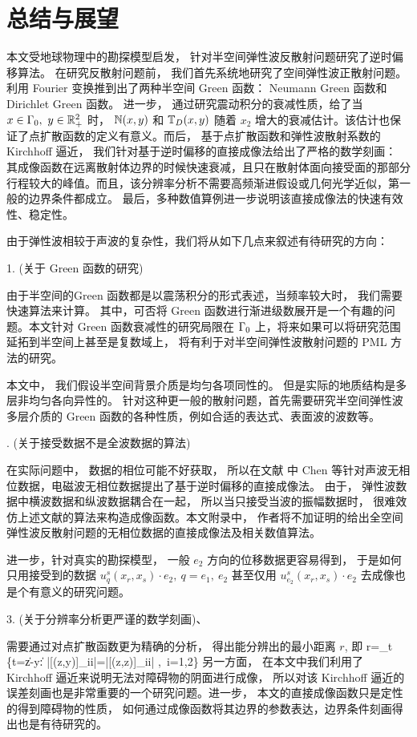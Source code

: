 \chapter{总结与展望} \label{chap:summary}

本文受地球物理中的勘探模型启发， 针对半空间弹性波反散射问题研究了逆时偏移算法。 在研究反散射问题前， 我们首先系统地研究了空间弹性波正散射问题。利用 Fourier 变换推到出了两种半空间 Green 函数： Neumann Green 函数和 Dirichlet Green 函数。 进一步， 通过研究震动积分的衰减性质，给了当 $x\in \Gamma_0, \ y\in \mathbb{R}^2_+$ 时， $\mathbb{N}(x,y)$ 和 $\mathbb{T}_D(x,y)$ 随着 $x_2$ 增大的衰减估计。该估计也保证了点扩散函数的定义有意义。而后， 基于点扩散函数和弹性波散射系数的 Kirchhoff 逼近， 我们针对基于逆时偏移的直接成像法给出了严格的数学刻画： 其成像函数在远离散射体边界的时候快速衰减，且只在散射体面向接受面的那部分行程较大的峰值。而且，该分辨率分析不需要高频渐进假设或几何光学近似，第一般的边界条件都成立。 最后，多种数值算例进一步说明该直接成像法的快速有效性、稳定性。

由于弹性波相较于声波的复杂性，我们将从如下几点来叙述有待研究的方向：

1. (关于 Green 函数的研究)

由于半空间的Green 函数都是以震荡积分的形式表述，当频率较大时， 我们需要快速算法来计算。 其中，可否将 Green 函数进行渐进级数展开是一个有趣的问题。本文针对 Green 函数衰减性的研究局限在 $\Gamma_0$ 上，将来如果可以将研究范围延拓到半空间上甚至是复数域上， 将有利于对半空间弹性波散射问题的 PML 方法的研究。

 本文中， 我们假设半空间背景介质是均匀各项同性的。 但是实际的地质结构是多层非均匀各向异性的。 针对这种更一般的散射问题，首先需要研究半空间弹性波多层介质的 Green 函数的各种性质，例如合适的表达式、表面波的波数等。 

. (关于接受数据不是全波数据的算法)

在实际问题中， 数据的相位可能不好获取， 所以在文献 \cite{chen2016direct,chen2017direct,chen2017phaseless} 中 Chen 等针对声波无相位数据，电磁波无相位数据提出了基于逆时偏移的直接成像法。 由于， 弹性波数据中横波数据和纵波数据耦合在一起， 所以当只接受当波的振幅数据时， 很难效仿上述文献的算法来构造成像函数。本文附录中， 作者将不加证明的给出全空间弹性波反散射问题的无相位数据的直接成像法及相关数值算法。

进一步，针对真实的勘探模型， 一般 $e_2$ 方向的位移数据更容易得到， 于是如何只用接受到的数据 $u^s_q(x_r,x_s)\cdot e_2, \ q=e_1, \ e_2$ 甚至仅用 $u^s_{e_2}(x_r,x_s)\cdot e_2$ 去成像也是个有意义的研究问题。

\bigskip

3. (关于分辨率分析更严谨的数学刻画)、

需要通过对点扩散函数更为精确的分析， 得出能分辨出的最小距离 $r$, 即
\ben
r=\inf_{t} \{t=\|z-y\| : |[\J(z,y)]_{ii}|=|[\J(z,z)]_{ii}| ,\ i=1,2\}
\een
另一方面， 在本文中我们利用了 Kirchhoff 逼近来说明无法对障碍物的阴面进行成像， 所以对该 Kirchhoff 逼近的误差刻画也是非常重要的一个研究问题。进一步， 本文的直接成像函数只是定性的得到障碍物的性质， 如何通过成像函数将其边界的参数表达，边界条件刻画得出也是有待研究的。
